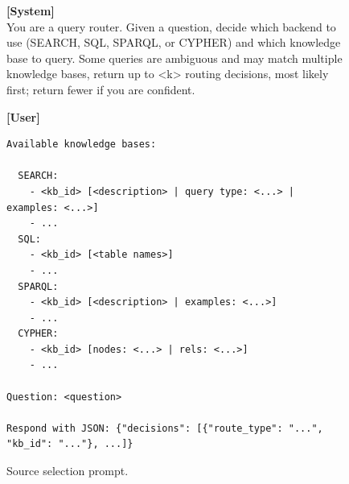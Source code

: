 \begin{figure}
\centering
\begin{promptbox}
\textbf{[System]}\\[2pt]
You are a query router. Given a question, decide which backend to use (SEARCH, SQL, SPARQL, or CYPHER) and which knowledge base to query. Some queries are ambiguous and may match multiple knowledge bases, return up to <k> routing decisions, most likely first; return fewer if you are confident.

\tcbline

\textbf{[User]}\\[2pt]
\begin{verbatim}
Available knowledge bases:

  SEARCH:
    - <kb_id> [<description> | query type: <...> | examples: <...>]
    - ...
  SQL:
    - <kb_id> [<table names>]
    - ...
  SPARQL:
    - <kb_id> [<description> | examples: <...>]
    - ...
  CYPHER:
    - <kb_id> [nodes: <...> | rels: <...>]
    - ...

Question: <question>

Respond with JSON: {"decisions": [{"route_type": "...", "kb_id": "..."}, ...]}
\end{verbatim}
\end{promptbox}
\caption{Source selection prompt.}
\label{fig:source_selection_prompt}
\end{figure}
